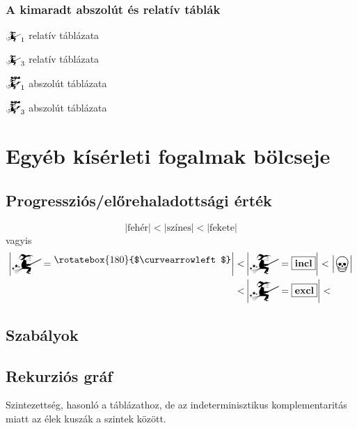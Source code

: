 \documentclass{article}
\newcommand{\nothing}{\text{\raisebox{0.4em}{\rotatebox{180}{$\curvearrowleft$}}}}%
\newcommand{\just}[1]{\boxed{#1}}%
\newcommand{\incl}{\mathbf{incl}}
\newcommand{\excl}{\mathbf{excl}}
\newcommand{\currymainfun}[1]{\mathwitch_{#1}}
\newcommand{\currymainfunabs}[1]{\overbat{\mathwitch*_{#1}}}
\newcommand{\progr}[1]{\left|#1\right|}
\begin{document}
	\subsubsection{A kimaradt abszolút és relatív táblák}

	\begin{table}[H]
		\caption*{$\currymainfun1$ relatív táblázata}
		\centering
	\end{table}

	\begin{table}[H]
		\caption*{$\currymainfun3$ relatív táblázata}
		\centering
	\end{table}

	\begin{table}[H]
		\caption*{$\currymainfunabs1$ abszolút táblázata}
		\centering
	\end{table}

	\begin{table}[H]
		\caption*{$\currymainfunabs3$ abszolút táblázata}
		\centering
	\end{table}

	\section{Egyéb kísérleti fogalmak bölcseje}

	\subsection{Progressziós/előrehaladottsági érték}
	\begin{displaymath}
		\progr{\text{fehér}} < \progr{\text{színes}} < \progr{\text{fekete}}
	\end{displaymath}
	vagyis
	\begin{align*}
		\progr{\mathwitch=\nothing} < &\progr{\mathwitch=\just\incl} < \progr{\bigskull}\\
		                            < &\progr{\mathwitch=\just\excl} <
	\end{align*}
	\subsection{Szabályok}

	\subsection{Rekurziós gráf}

	Szintezettség, hasonló a táblázathoz, de az indeterminisztikus komplementaritás miatt az élek kuszák a szintek között.
\end{document}
